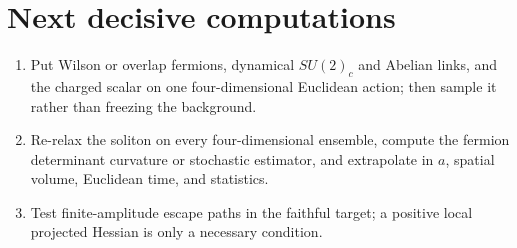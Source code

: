 \documentclass[11pt]{article}
\theoremstyle{definition}
\theoremstyle{remark}
\begin{document}
\section{Next decisive computations}

\begin{enumerate}
\item Put Wilson or overlap fermions, dynamical \(SU(2)_c\) and Abelian links,
and the charged scalar on one four-dimensional Euclidean action; then sample
it rather than freezing the background.
\item Re-relax the soliton on every four-dimensional ensemble, compute the
fermion determinant curvature or stochastic estimator, and extrapolate in
\(a\), spatial volume, Euclidean time, and statistics.
\item Test finite-amplitude escape paths in the faithful target; a positive
local projected Hessian is only a necessary condition.
\end{enumerate}



\end{document}
